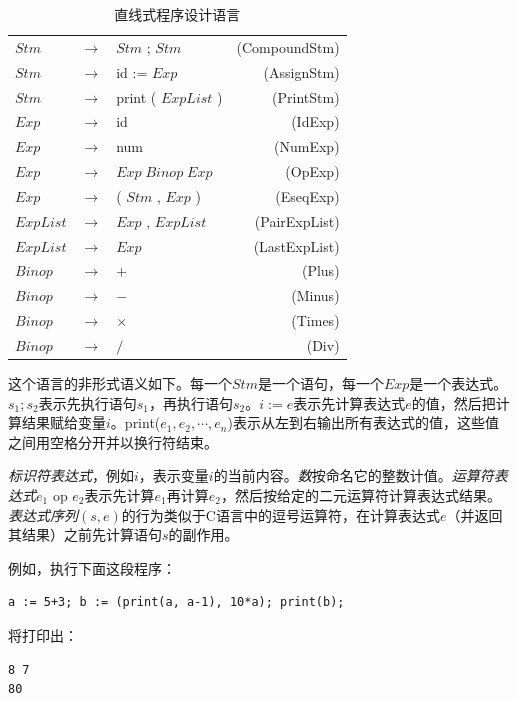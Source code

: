\documentclass[cn,11pt,chinese]{elegantbook}
\begin{document}
\renewcommand\tablename{文法}
\begin{table}[htbp]
  \centering
  \begin{tabular}{lllr}
  $Stm$ & $\rightarrow$ & $Stm$ ; $Stm$ & (CompoundStm) \\
  $Stm$ & $\rightarrow$ & id := $Exp$ & (AssignStm) \\
  $Stm$ & $\rightarrow$ & print ( $ExpList$ ) & (PrintStm) \\
  $Exp$ & $\rightarrow$ & id & (IdExp) \\
  $Exp$ & $\rightarrow$ & num & (NumExp) \\
  $Exp$ & $\rightarrow$ & $Exp \; Binop \; Exp$ & (OpExp) \\
  $Exp$ & $\rightarrow$ & ( $Stm$ , $Exp$ ) & (EseqExp) \\
  $ExpList$ & $\rightarrow$ & $Exp$ , $ExpList$ & (PairExpList) \\
  $ExpList$ & $\rightarrow$ & $Exp$ & (LastExpList) \\
  $Binop$ & $\rightarrow$ & $+$ & (Plus) \\
  $Binop$ & $\rightarrow$ & $-$ & (Minus) \\
  $Binop$ & $\rightarrow$ & $\times$ & (Times) \\
  $Binop$ & $\rightarrow$ & $/$ & (Div) \\
  \end{tabular}
  \caption{直线式程序设计语言}\label{grammar:1-3}
\end{table}
\renewcommand\tablename{表}

这个语言的非形式语义如下。每一个$Stm$是一个语句，每一个$Exp$是一个表达式。$s_1;s_2$表示先执行语句$s_1$，再执行语句$s_2$。$i := e$表示先计算表达式$e$的值，然后把计算结果赋给变量$i$。print($e_1,e_2,\cdots,e_n$)表示从左到右输出所有表达式的值，这些值之间用空格分开并以换行符结束。

\textit{标识符表达式}，例如$i$，表示变量$i$的当前内容。\textit{数}按命名它的整数计值。\textit{运算符表达式}$e_1$ op $e_2$表示先计算$e_1$再计算$e_2$，然后按给定的二元运算符计算表达式结果。\textit{表达式序列}$(s,e)$的行为类似于C语言中的逗号运算符，在计算表达式$e$（并返回其结果）之前先计算语句$s$的副作用。

例如，执行下面这段程序：

\begin{verbatim}
a := 5+3; b := (print(a, a-1), 10*a); print(b);  
\end{verbatim}

将打印出：

\begin{verbatim}
8 7
80
\end{verbatim}
\end{document}
